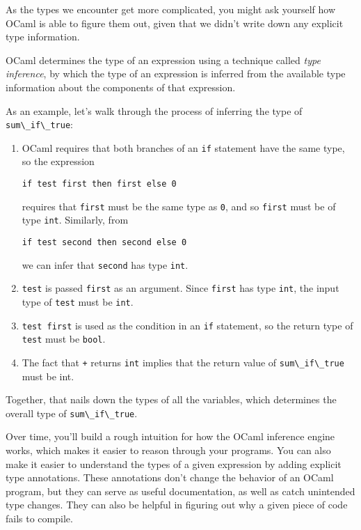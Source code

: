 As the types we encounter get more complicated, you might ask yourself
how OCaml is able to figure them out, given that we didn't write down
any explicit type information.

OCaml determines the type of an expression using a technique called
\emph{type inference}, by which the type of an expression is inferred
from the available type information about the components of that
expression.

As an example, let's walk through the process of inferring the type of
\passthrough{\lstinline!sum\_if\_true!}:

\begin{enumerate}
\def\labelenumi{\arabic{enumi}.}
\item
  OCaml requires that both branches of an \passthrough{\lstinline!if!}
  statement have the same type, so the expression

  \passthrough{\lstinline!if test first then first else 0!}

  requires that \passthrough{\lstinline!first!} must be the same type as
  \passthrough{\lstinline!0!}, and so \passthrough{\lstinline!first!}
  must be of type \passthrough{\lstinline!int!}. Similarly, from

  \passthrough{\lstinline!if test second then second else 0!}

  we can infer that \passthrough{\lstinline!second!} has type
  \passthrough{\lstinline!int!}.
\item
  \passthrough{\lstinline!test!} is passed
  \passthrough{\lstinline!first!} as an argument. Since
  \passthrough{\lstinline!first!} has type
  \passthrough{\lstinline!int!}, the input type of
  \passthrough{\lstinline!test!} must be \passthrough{\lstinline!int!}.
\item
  \passthrough{\lstinline!test first!} is used as the condition in an
  \passthrough{\lstinline!if!} statement, so the return type of
  \passthrough{\lstinline!test!} must be \passthrough{\lstinline!bool!}.
\item
  The fact that \passthrough{\lstinline!+!} returns
  \passthrough{\lstinline!int!} implies that the return value of
  \passthrough{\lstinline!sum\_if\_true!} must be int.
\end{enumerate}

Together, that nails down the types of all the variables, which
determines the overall type of \passthrough{\lstinline!sum\_if\_true!}.

Over time, you'll build a rough intuition for how the OCaml inference
engine works, which makes it easier to reason through your programs. You
can also make it easier to understand the types of a given expression by
adding explicit type annotations. These annotations don't change the
behavior of an OCaml program, but they can serve as useful
documentation, as well as catch unintended type changes. They can also
be helpful in figuring out why a given piece of code fails to compile.

